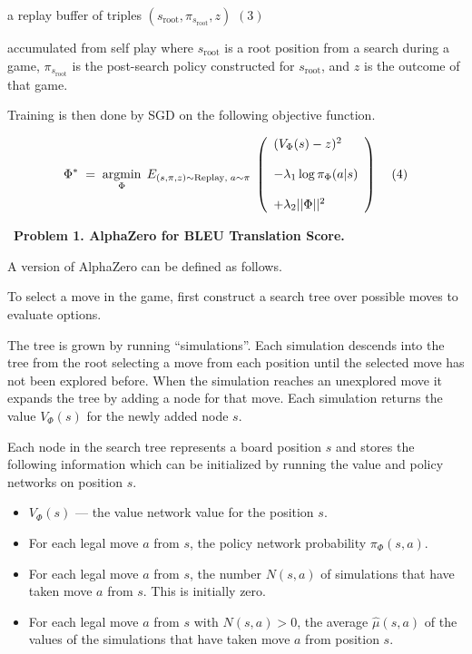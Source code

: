 \documentclass{article}
\begin{document}
\medskip
\centerline{a replay buffer of triples $(s_{\mathrm{root}},\pi_{s_{\mathrm{root}}},z)$ \hspace{2em}$(3)$}

\medskip
accumulated from self play where $s_{\mathrm{root}}$ is a root position from a search during a game,
$\pi_{s_{\mathrm{root}}}$ is the post-search policy constructed for $s_{\mathrm{root}}$, and $z$ is the outcome of that game.

\medskip
Training is then done by SGD on the following objective function.

$$\Phi^*\; = \;\operatorname*{argmin}_\Phi \;E_{(s,\pi,z) \sim \mathrm{Replay},\;a \sim \pi}\;\left(\begin{array}{l} (V_\Phi(s) - z)^2 \\ \\ - \lambda_1\log \pi_\Phi(a|s) \\ \\ + \lambda_2||\Phi||^2\end{array}\right)\;\;\;\;(4)$$

  
~{\bf Problem 1. AlphaZero for BLEU Translation Score.}

A version of AlphaZero can be defined as follows.

\medskip
To select a move in the game, first construct a search tree over possible moves to evaluate options.

\medskip
The tree is grown by running ``simulations''.  Each simulation descends into the tree from the root selecting a move from each position
until the selected move has not been explored before.  When the simulation reaches an unexplored move it expands the tree by adding a node for that move.
Each simulation returns the value $V_\Phi(s)$ for the newly added node $s$.

\medskip
Each node in the search tree represents a board position $s$ and stores the following information which can be initialized
by running the value and policy networks on position $s$.

\begin{itemize}
\item $V_\Phi(s)$ --- the value network value for the position $s$.
\item For each legal move $a$ from $s$, the policy network probability $\pi_\Phi(s,a)$.
\item For each legal move $a$ from $s$, the number $N(s,a)$ of simulations that have taken move $a$ from $s$. This is initially zero.
\item For each legal move $a$ from $s$ with $N(s,a) > 0$, the average $\hat{\mu}(s,a)$ of the values of the simulations that have
  taken move $a$ from position $s$.
\end{itemize}
\end{document}
